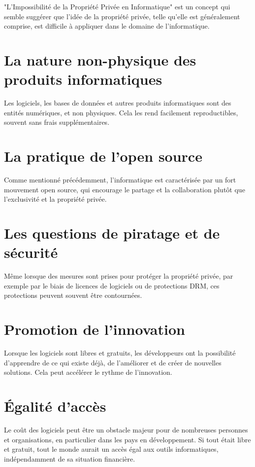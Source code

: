 "L’Impossibilité de la Propriété Privée en Informatique" est un concept qui semble suggérer que l'idée de la propriété privée, telle qu'elle est généralement comprise, est difficile à appliquer dans le domaine de l'informatique.\\

\section{La nature non-physique des produits informatiques} 
 Les logiciels, les bases de données et autres produits informatiques sont des entités numériques, et non physiques. Cela les rend facilement reproductibles, souvent sans frais supplémentaires.

\section{La pratique de l'open source } Comme mentionné précédemment, l'informatique est caractérisée par un fort mouvement open source, qui encourage le partage et la collaboration plutôt que l'exclusivité et la propriété privée.

    \section{Les questions de piratage et de sécurité}  Même lorsque des mesures sont prises pour protéger la propriété privée, par exemple par le biais de licences de logiciels ou de protections DRM, ces protections peuvent souvent être contournées.


    \section{Promotion de l'innovation} Lorsque les logiciels sont libres et gratuits, les développeurs ont la possibilité d'apprendre de ce qui existe déjà, de l'améliorer et de créer de nouvelles solutions. Cela peut accélérer le rythme de l'innovation.

    \section{Égalité d'accès}  Le coût des logiciels peut être un obstacle majeur pour de nombreuses personnes et organisations, en particulier dans les pays en développement. Si tout était libre et gratuit, tout le monde aurait un accès égal aux outils informatiques, indépendamment de sa situation financière.

